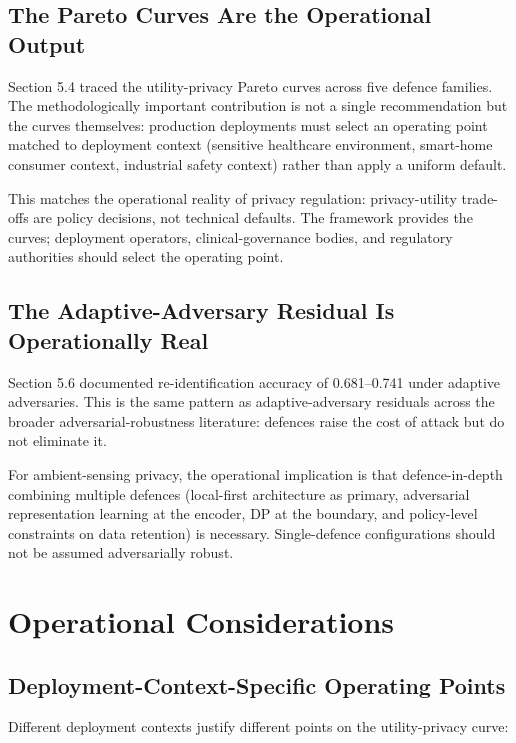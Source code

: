 \documentclass[sigconf,nonacm]{acmart}
\begin{document}
\subsection{The Pareto Curves Are the Operational Output}

Section 5.4 traced the utility-privacy Pareto curves across five
defence families. The methodologically important contribution is
not a single recommendation but the curves themselves: production
deployments must select an operating point matched to deployment
context (sensitive healthcare environment, smart-home consumer
context, industrial safety context) rather than apply a uniform
default.

This matches the operational reality of privacy regulation:
privacy-utility trade-offs are policy decisions, not technical
defaults. The framework provides the curves; deployment operators,
clinical-governance bodies, and regulatory authorities should
select the operating point.

\subsection{The Adaptive-Adversary Residual Is Operationally Real}

Section 5.6 documented re-identification accuracy of 0.681--0.741
under adaptive adversaries. This is the same pattern as adaptive-adversary
residuals across the broader adversarial-robustness literature:
defences raise the cost of attack but do not eliminate it.

For ambient-sensing privacy, the operational implication is that
defence-in-depth combining multiple defences (local-first
architecture as primary, adversarial representation learning at
the encoder, DP at the boundary, and policy-level constraints on
data retention) is necessary. Single-defence configurations
should not be assumed adversarially robust.

\section{Operational Considerations}

\subsection{Deployment-Context-Specific Operating Points}

Different deployment contexts justify different points on the
utility-privacy curve:
\end{document}
